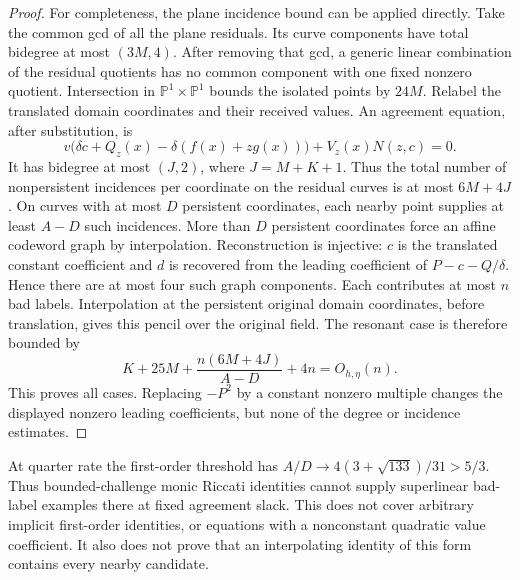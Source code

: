 \begin{proof}
For completeness, the plane incidence bound can be applied directly.
Take the common gcd of all the plane residuals. Its curve components
have total bidegree at most $(3M,4)$. After removing that gcd, a generic
linear combination of the residual quotients has no common component
with one fixed nonzero quotient. Intersection in
$\mathbb P^1\times\mathbb P^1$ bounds the isolated points by $24M$.
Relabel the translated domain coordinates and their received values.
An agreement equation, after substitution, is
\[
 v\bigl(\delta c+Q_z(x)-\delta(f(x)+zg(x))\bigr)+V_z(x)N(z,c)=0.
\]
It has bidegree at most $(J,2)$, where $J=M+K+1$. Thus the total number
of nonpersistent incidences per coordinate on the residual curves is
at most $6M+4J$. On curves with at most $D$ persistent coordinates,
each nearby point supplies at least $A-D$ such incidences. More than
$D$ persistent coordinates force an affine codeword graph by interpolation.
Reconstruction is injective: $c$ is the translated constant coefficient
and $d$ is recovered from the leading coefficient of $P-c-Q/\delta$.
Hence there are at most four such graph components. Each contributes at
most $n$ bad labels. Interpolation at the persistent original domain coordinates, before
translation, gives this pencil over the original field. The resonant case is therefore bounded by
\begin{equation}\label{eq:riccati-resonance-bound}
 K+25M+\frac{n(6M+4J)}{A-D}+4n=O_{h,\eta}(n).
\end{equation}
This proves all cases. Replacing $-P^2$ by a constant nonzero multiple
changes the displayed nonzero leading coefficients, but none of the
degree or incidence estimates.
\end{proof}

At quarter rate the first-order threshold has
$A/D\to4(3+\sqrt{133})/31>5/3$. Thus bounded-challenge monic Riccati
identities cannot supply superlinear bad-label examples there at fixed
agreement slack. This does not cover arbitrary implicit first-order
identities, or equations with a nonconstant quadratic value coefficient.
It also does not prove that an interpolating identity of this form
contains every nearby candidate.

